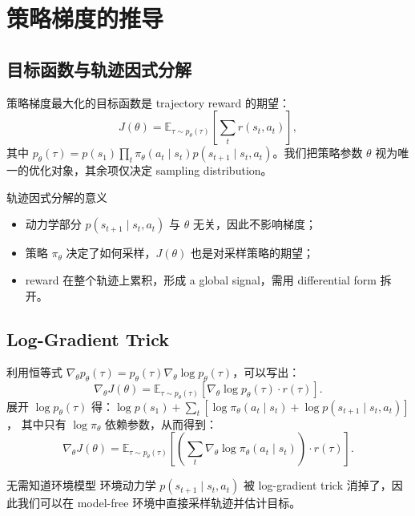 \section{策略梯度的推导}

\subsection{目标函数与轨迹因式分解}

策略梯度最大化的目标函数是 trajectory reward 的期望：
$$J(\theta) = \mathbb{E}_{\tau \sim p_\theta(\tau)} \left[ \sum_t r(s_t, a_t) \right],$$
其中 $p_\theta(\tau) = p(s_1)\prod_t \pi_\theta(a_t\mid s_t)p(s_{t+1}\mid s_t,a_t)$。我们把策略参数 $\theta$ 视为唯一的优化对象，其余项仅决定 sampling distribution。

\begin{knowledgebox}{轨迹因式分解的意义}
\begin{itemize}
    \item 动力学部分 $p(s_{t+1}\mid s_t,a_t)$ 与 $\theta$ 无关，因此不影响梯度；
    \item 策略 $\pi_\theta$ 决定了如何采样，$J(\theta)$ 也是对采样策略的期望；
    \item reward 在整个轨迹上累积，形成 a global signal，需用 differential form 拆开。
\end{itemize}
\end{knowledgebox}

\subsection{Log-Gradient Trick}

利用恒等式 $\nabla_\theta p_\theta(\tau) = p_\theta(\tau) \nabla_\theta \log p_\theta(\tau)$，可以写出：
$$\nabla_\theta J(\theta) = \mathbb{E}_{\tau \sim p_\theta(\tau)} \left[ \nabla_\theta \log p_\theta(\tau) \cdot r(\tau) \right].$$
展开 $\log p_\theta(\tau)$ 得：$\log p(s_1) + \sum_t \left[\log \pi_\theta(a_t\mid s_t) + \log p(s_{t+1}\mid s_t,a_t)\right]$，
其中只有 $\log \pi_\theta$ 依赖参数，从而得到：
$$\nabla_\theta J(\theta) = \mathbb{E}_{\tau \sim p_\theta(\tau)} \left[ \left(\sum_t \nabla_\theta \log \pi_\theta(a_t\mid s_t)\right) \cdot r(\tau) \right].$$

\begin{importantbox}{无需知道环境模型}
环境动力学 $p(s_{t+1}\mid s_t,a_t)$ 被 log-gradient trick 消掉了，因此我们可以在 model-free 环境中直接采样轨迹并估计目标。
\end{importantbox}

